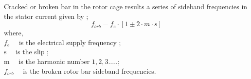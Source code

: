 Cracked or broken bar in the rotor cage results a series of sideband frequencies in the stator current given by \cite{karmakar2016induction};
\begin{equation}
	f_{brb}=f_{e} \cdot\left[1 \pm 2\cdot m\cdot s \right]
	\label{rotorfault}
\end{equation}
where,\\
$f_{e} \quad$ is the electrical supply frequency ;\\
$\mathrm{s} \quad$ is the slip ;\\
$\mathrm{m} \quad$ is the harmonic number $1,2,3 \ldots$..;\\
$f_{brb} \quad$ is the broken rotor bar sideband frequencies.


	
	  
